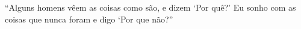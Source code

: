 ``Alguns homens vêem as coisas como são, e dizem ‘Por quê?’ Eu sonho com as coisas que nunca foram e digo ‘Por que não?''



